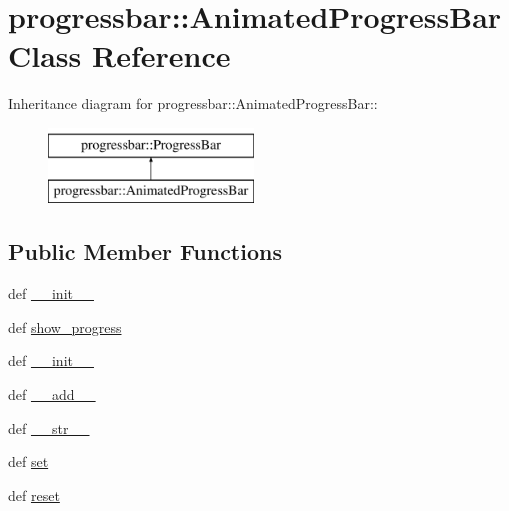 \hypertarget{classprogressbar_1_1AnimatedProgressBar}{
\section{progressbar::AnimatedProgressBar Class Reference}
\label{classprogressbar_1_1AnimatedProgressBar}
}
Inheritance diagram for progressbar::AnimatedProgressBar::\begin{figure}[H]
\begin{center}
\leavevmode
\includegraphics[height=2cm]{classprogressbar_1_1AnimatedProgressBar}
\end{center}
\end{figure}
\subsection*{Public Member Functions}
\begin{DoxyCompactItemize}
\item 
def \hyperlink{classprogressbar_1_1AnimatedProgressBar_a30d884afb012f2565e7ef52df5176a89}{\_\-\_\-init\_\-\_\-}
\item 
def \hyperlink{classprogressbar_1_1AnimatedProgressBar_a2b4fc789e3220d4ed1e1b9d538776c92}{show\_\-progress}
\item 
def \hyperlink{classprogressbar_1_1ProgressBar_a7ad95b3ae7b580117dd48355a3e967ae}{\_\-\_\-init\_\-\_\-}
\item 
def \hyperlink{classprogressbar_1_1ProgressBar_a1f77ba8c29d99201812d6072c196c442}{\_\-\_\-add\_\-\_\-}
\item 
def \hyperlink{classprogressbar_1_1ProgressBar_ad7acb97d5893c7c67d9e1c8224364df9}{\_\-\_\-str\_\-\_\-}
\item 
def \hyperlink{classprogressbar_1_1ProgressBar_ad47beed6bd8b7239d0e8ce37966c96e6}{set}
\item 
def \hyperlink{classprogressbar_1_1ProgressBar_a1e3174a60591ce40f957310b350d62d4}{reset}
\end{DoxyCompactItemize}
